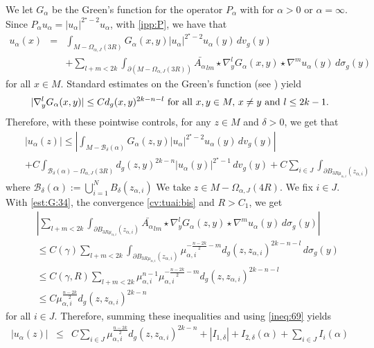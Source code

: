 \documentclass[reqno]{amsart}
\def \crit {2^\star}
\def \ua {u_\alpha}
\def \mai {\mu_{\alpha,i}}
\def \zai {z_{\alpha,i}}
\begin{document}
\medskip\noindent  We let $G_\alpha$ be the Green's function for the operator $P_\alpha$ with for $\alpha>0$ or $\alpha=\infty$. Since $P_\alpha\ua=|\ua|^{\crit-2}\ua$, with \eqref{ipp:P}, we have that
\begin{eqnarray*}
\ua(x)&=&\int_{M-\Omega_{\alpha,J}(3R)} G_\alpha(x,y)|\ua|^{\crit-2}\ua(y)\, dv_g(y)\\
&&+ \sum_{l+m<2k}\int_{\partial(M-\Omega_{\alpha,J}(3R))}\bar{A_\alpha}_{lm}\star\nabla^l_yG_\alpha(x,y)\star \nabla^m u_\alpha(y)\, d\sigma_g(y)
\end{eqnarray*}
for all $x\in M$. Standard estimates on the Green's function (see \cite{robert:gjms}) yield
\begin{equation}\label{est:G:34}
|\nabla_y^lG_\alpha(x,y)|\leq C d_g(x,y)^{2k-n-l}\hbox{ for all }x,y\in M,\, x\neq y\hbox{ and }l\leq 2k-1.
\end{equation}
Therefore, with these pointwise controls, for any $z\in M$ and $\delta>0$, we get that
\begin{eqnarray*}
&&|\ua(z)|\leq \left|\int_{M-{\mathcal B}_\delta(\alpha)} G_\alpha(z,y)|\ua|^{\crit-2}\ua(y)\, dv_g(y)\right|\\
&&+C\int_{{\mathcal B}_\delta(\alpha)-\Omega_{\alpha, J}(3R)}d_g(z,y)^{2k-n}|\ua(y)|^{\crit-1}\, dv_g(y)+C\sum_{i\in J}\int_{\partial B_{3R\mai}(\zai)}
\end{eqnarray*}
where ${\mathcal B}_\delta(\alpha):=\bigcup_{i=1}^NB_\delta(\zai)$
We take  $z\in M-\Omega_{\alpha,J}(4R)$. We fix $i\in J$. With \eqref{est:G:34}, the convergence \eqref{cv:tuai:bis} and $R>C_1$, we get 
\begin{eqnarray}
&&\left|\sum_{l+m<2k}\int_{\partial B_{3R\mai}(\zai)}\bar{A_\alpha}_{lm}\star\nabla^l_yG_\alpha(z,y)\star \nabla^m u_\alpha (y)\, d\sigma_g(y)\right|\nonumber\\
&&\leq C(\gamma) \sum_{l+m<2k}\int_{\partial B_{3R\mai}(\zai)} \mai^{-\frac{n-2k}{2}-m}d_g(z,\zai)^{2k-n-l}\,  d\sigma_g(y)\nonumber\\
&&\leq C(\gamma,R) \sum_{l+m<2k}\mai^{n-1} \mai^{-\frac{n-2k}{2}-m} d_g(z,\zai)^{2k-n-l}\nonumber\\
&&\leq C\mai^{\frac{n-2k}{2}}d_g(z,\zai)^{2k-n}\label{ineq:546}
\end{eqnarray}
for all $i\in J$. Therefore, summing these inequalities and using \eqref{ineq:69} yields
\begin{eqnarray}
|\ua(z)|&\leq  &C\sum_{i\in J} \mai^{\frac{n-2k}{2}}d_g(z,\zai)^{2k-n} +\left|I_{1,\delta}\right|+I_{2,\delta}(\alpha) +\sum_{i\in J}I_i(\alpha)\label{ineq:86}
\end{eqnarray}
\end{document}
